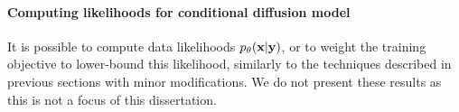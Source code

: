 \paragraph{Computing likelihoods for conditional diffusion model}
It is possible to compute data likelihoods $p_\theta({\mathbf{x}}|{\mathbf{y}})$, or to weight the training objective to lower-bound this likelihood, similarly to the techniques described in previous sections with minor modifications. We do not present these results as this is not a focus of this dissertation.



